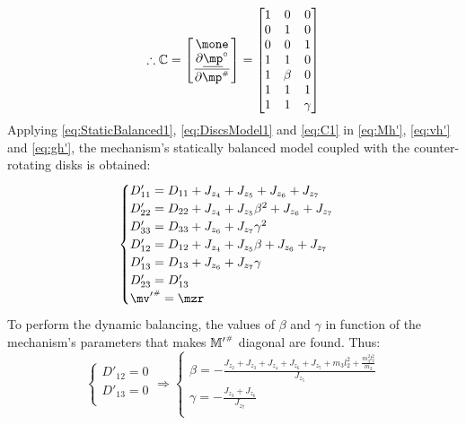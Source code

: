 \documentclass[a4paper,11pt,brazil,fleqn]{article}
\begin{document}
\begin{equation}\label{eq:C1}
\therefore\mC =
\begin{bmatrix}
\mone \\
\displaystyle\frac{\partial \underline{\mp}^\circ}{\partial \mp\ssh}
\end{bmatrix}  =
\begin{bmatrix}
1 & 0 & 0 \\
0 & 1 & 0 \\
0 & 0 & 1 \\
1 & 1     & 0 \\
1 & \beta & 0 \\
1 & 1     & 1 \\
1 & 1     & \gamma \\
\end{bmatrix} 
\end{equation}
Applying \eqref{eq:StaticBalanced1}, \eqref{eq:DiscsModel1} and \eqref{eq:C1} in \eqref{eq:Mh'}, \eqref{eq:vh'} and \eqref{eq:gh'}, the mechanism's statically balanced model coupled with the counter-rotating disks is obtained:
\begin{equation}\label{eq:CoupledDynamics1}
\begin{cases}
D'_{11} = D_{11} + J_{z_4} + J_{z_5} + J_{z_6} + J_{z_7} \\
D'_{22} = D_{22} + J_{z_4} + J_{z_5} \beta^2 + J_{z_6} + J_{z_7} \\
D'_{33} = D_{33} + J_{z_6} + J_{z_7} \gamma^2 \\
D'_{12} = D_{12} + J_{z_4} + J_{z_5} \beta + J_{z_6} + J_{z_7} \\
D'_{13} = D_{13} + J_{z_6} + J_{z_7} \gamma  \\
D'_{23} = D'_{13}\\
{\mv'}\ssh = \mzr \\
\end{cases}
\end{equation}
To perform the dynamic balancing, the values of $\beta$ and $\gamma$ in function of the mechanism's parameters that makes ${\mathbb{M}'}^{\scriptscriptstyle \#}$ diagonal are found. Thus:
\begin{equation}\label{eq:DynamicBalancing1}
\begin{cases}
D'_{12} = 0 \\
D'_{13} = 0 \\
\end{cases}
\Rightarrow
\begin{cases}
\beta = -\frac{J_{z_2} + J_{z_3} + J_{z_4} + J_{z_6} + J_{z_7} + m_3 l_2^2 + \frac{m_3^2 l_2^2}{m_2}}{J_{z_5}} \\
\gamma = -\frac{J_{z_3} + J_{z_6}}{J_{z_7}} \\
\end{cases}
\end{equation}
\end{document}
